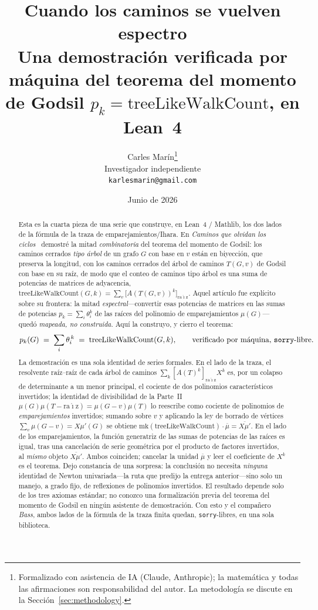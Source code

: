 \documentclass[11pt]{article}
\title{\bf Cuando los caminos se vuelven espectro\\[4pt]
  \large\normalfont Una demostraci\'on verificada por m\'aquina del teorema del momento de Godsil
  $p_k=\mathrm{treeLikeWalkCount}$, en Lean~4}
\author{Carles Mar\'in\thanks{Formalizado con asistencia de IA (Claude, Anthropic); la matem\'atica y
todas las afirmaciones son responsabilidad del autor. La metodolog\'ia se discute en la
Secci\'on~\ref{sec:methodology}.}\\[3pt]
  \normalsize Investigador independiente\\
  \normalsize \texttt{karlesmarin@gmail.com}}
\date{Junio de 2026}
\newcommand{\lean}[1]{{\def\_{\textunderscore\allowbreak}\texttt{#1}}}
\begin{document}
\maketitle

\begin{abstract}
Esta es la cuarta pieza de una serie que construye, en Lean~4 / Mathlib, los dos lados de la f\'ormula
de la traza de emparejamientos/Ihara. En \emph{Caminos que olvidan los ciclos}~\cite{PartIII} demostr\'e
la mitad \emph{combinatoria} del teorema del momento de Godsil: los caminos cerrados \emph{tipo
\'arbol} de un grafo $G$ con base en $v$ est\'an en biyecci\'on, que preserva la longitud, con los
caminos cerrados del \'arbol de caminos $T(G,v)$ de Godsil con base en su ra\'iz, de modo que el conteo
de caminos tipo \'arbol es una suma de potencias de matrices de adyacencia,
$\mathrm{treeLikeWalkCount}(G,k)=\sum_v\bigl[A(T(G,v))^k\bigr]_{\mathrm{ra\acute{\imath}z}}$. Aquel
art\'iculo fue expl\'icito sobre su frontera: la mitad \emph{espectral}---convertir esas potencias de
matrices en las sumas de potencias $p_k=\sum_i\theta_i^k$ de las ra\'ices del polinomio de
emparejamientos $\mu(G)$---qued\'o \emph{mapeada, no construida}. Aqu\'i la construyo, y cierro el
teorema:
\[
  p_k(G)\;=\;\sum_i\theta_i^{\,k}\;=\;\mathrm{treeLikeWalkCount}(G,k),
  \qquad\text{verificado por m\'aquina, \lean{sorry}-libre.}
\]
La demostraci\'on es una sola identidad de series formales. En el lado de la traza, el resolvente
ra\'iz--ra\'iz de cada \'arbol de caminos $\sum_k[A(T)^k]_{\mathrm{ra\acute{\imath}z}}X^k$ es, por un
colapso de determinante a un menor principal, el cociente de dos polinomios caracter\'isticos
invertidos; la identidad de divisibilidad de la Parte~II $\mu(G)\mu(T-\mathrm{ra\acute{\imath}z})=\mu(G-v)\mu(T)$
lo reescribe como cociente de polinomios de \emph{emparejamientos} invertidos; sumando sobre $v$ y
aplicando la ley de borrado de v\'ertices $\sum_v\mu(G-v)=X\mu'(G)$ se obtiene
$\mathrm{mk}(\mathrm{treeLikeWalkCount})\cdot\overline{\mu}=\overline{X\mu'}$. En el lado de los
emparejamientos, la funci\'on generatriz de las sumas de potencias de las ra\'ices es igual, tras una
cancelaci\'on de serie geom\'etrica por el producto de factores invertidos, al \emph{mismo} objeto
$\overline{X\mu'}$. Ambos coinciden; cancelar la unidad $\overline{\mu}$ y leer el coeficiente de
$X^k$ es el teorema. Dejo constancia de una sorpresa: la conclusi\'on no necesita \emph{ninguna}
identidad de Newton univariada---la ruta que predijo la entrega anterior---sino solo un manejo, a grado
fijo, de reflexiones de polinomios invertidos. El resultado depende solo de los tres axiomas
est\'andar; no conozco una formalizaci\'on previa del teorema del momento de Godsil en ning\'un
asistente de demostraci\'on. Con esto y el compa\~nero \emph{Bass}, ambos lados de la f\'ormula de la
traza finita quedan, \lean{sorry}-libres, en una sola biblioteca.
\end{abstract}
\end{document}
